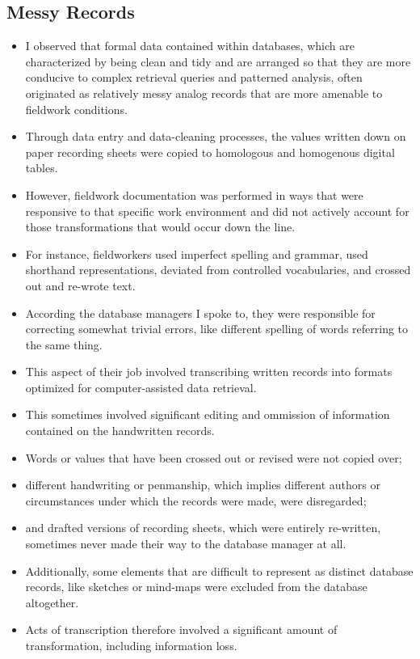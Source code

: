 \documentclass{article}
\begin{document}
\subsection{Messy Records}
\begin{itemize}
  \item I observed that formal data contained within databases, which are characterized by being clean and tidy and are arranged so that they are more conducive to complex retrieval queries and patterned analysis, often originated as relatively messy analog records that are more amenable to fieldwork conditions.
  \item Through data entry and data-cleaning processes, the values written down on paper recording sheets were copied to homologous and homogenous digital tables.
  \item However, fieldwork documentation was performed in ways that were responsive to that specific work environment and did not actively account for those transformations that would occur down the line.
  \item For instance, fieldworkers used imperfect spelling and grammar, used shorthand representations, deviated from controlled vocabularies, and crossed out and re-wrote text.

  \item According the database managers I spoke to, they were responsible for correcting somewhat trivial errors, like different spelling of words referring to the same thing.
  \item This aspect of their job involved transcribing written records into formats optimized for computer-assisted data retrieval.
  
  \item This sometimes involved significant editing and ommission of information contained on the handwritten records.
  \item Words or values that have been crossed out or revised were not copied over;
  \item different handwriting or penmanship, which implies different authors or circumstances under which the records were made, were disregarded;
  \item and drafted versions of recording sheets, which were entirely re-written, sometimes never made their way to the database manager at all.
  
  \item Additionally, some elements that are difficult to represent as distinct database records, like sketches or mind-maps were excluded from the database altogether.

  \item Acts of transcription therefore involved a significant amount of transformation, including information loss.
\end{itemize}
\end{document}
